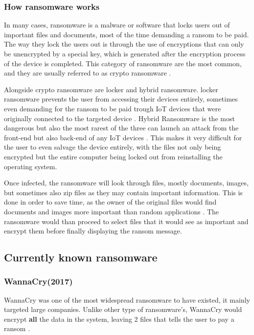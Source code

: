 \documentclass[progress]{cmpreport}
\begin{document}
		\subsubsection{How ransomware works}
			In many cases, ransomware is a malware or software that locks users out of important files and documents, most of the time demanding a ransom to be paid. The way they lock the users out is through the use of encryptions that can only be unencrypted by a special key, which is generated after the encryption process of the device is completed. This category of ransomware are the most common, and they are usually referred to as crypto ransomware \citep{7536529}. 
			
			Alongside crypto ransomware are locker and hybrid ransomware. locker ransomware prevents the user from accessing their devices entirely, sometimes even demanding for the ransom to be paid trough IoT devices that were originally connected to the targeted device \citep{YAQOOB2017444}. Hybrid Ransomware is the most dangerous but also the most rarest of the three can launch an attack from the front-end but also back-end of any IoT devices \citep{YAQOOB2017444}. This makes it very difficult for the user to even salvage the device entirely, with the files not only being encrypted but the entire computer being locked out from reinstalling the operating system.
			
			Once infected, the ransomware will look through files, mostly documents, images, but sometimes also zip files as they may contain important information. This is done in order to save time, as the owner of the original files would find documents and images more important than random applications \citep{Gazet}. The ransomware would than proceed to select files that it would see as important and encrypt them before finally displaying the ransom message. 
			
		\subsection{Currently known ransomware}
			\subsubsection{WannaCry(2017)}
			WannaCry was one of the most widespread ransomware to have existed, it mainly targeted large companies. Unlike other type of ransomware's, WannaCry would encrypt \textbf{all} the data in the system, leaving 2 files that tells the user to pay a ransom \citep{Mohurle&Patil}. 
			
\end{document}
